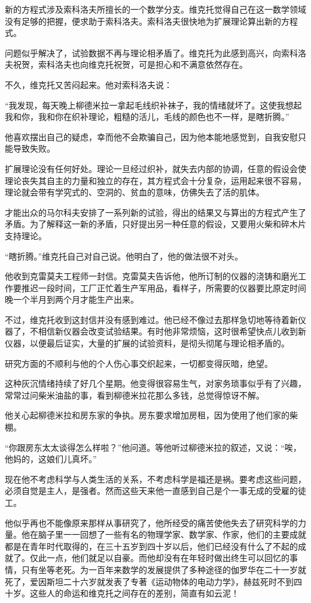 新的方程式涉及索科洛夫所擅长的一个数学分支。维克托觉得自己在这一数学领域没有足够的把握，便求助于索科洛夫。索科洛夫很快地为扩展理论算出新的方程式。

问题似乎解决了，试验数据不再与理论相矛盾了。维克托为此感到高兴，向索科洛夫祝贺，索科洛夫也向维克托祝贺，可是担心和不满意依然存在。

不久，维克托又苦闷起来。他对索科洛夫说：

“我发现，每天晚上柳德米拉一拿起毛线织补袜子，我的情绪就坏了。这使我想起我和你，我和你在织补理论，粗糙的活儿，毛线的颜色也不一样，是瞎折腾。”

他喜欢摆出自己的疑虑，幸而他不会欺骗自己，因为他本能地感觉到，自我安慰只能导致失败。

扩展理论没有任何好处。理论一旦经过织补，就失去内部的协调，任意的假设会使理论丧失其自主的力量和独立的存在，其方程式会十分复杂，运用起来很不容易，理论就会带有学究式的、空洞的、贫血的意味，仿佛失去了活的肌体。

才能出众的马尔科夫安排了一系列新的试验，得出的结果又与算出的方程式产生了矛盾。为了解释这一新的矛盾，只好提出另一种任意的假设，又要用火柴和碎木片支持理论。

“瞎折腾。”维克托自己对自己说。他明白了，他的做法很不对头。

他收到克雷莫夫工程师一封信。克雷莫夫告诉他，他所订制的仪器的浇铸和磨光工作要推迟一段时间，工厂正忙着生产军用品，看样子，所需要的仪器要比原定时间晚一个半月到两个月才能生产出来。

不过，维克托收到这封信并没有感到难过。他已经不像过去那样急切地等待着新仪器了，不相信新仪器会改变试验结果。有时他非常烦恼，这时很希望快点儿收到新仪器，以便最后证实，大量的扩展的试验资料，是彻头彻尾与理论相矛盾的。

研究方面的不顺利与他的个人伤心事交织起来，一切都变得灰暗，绝望。

这种灰沉情绪持续了好几个星期。他变得很容易生气，对家务琐事似乎有了兴趣，常常过问柴米油盐的事，看到柳德米拉花那么多钱，总觉得惊讶不解。

他关心起柳德米拉和房东家的争执。房东要求增加房租，因为使用了他们家的柴棚。

“你跟房东太太谈得怎么样啦？”他问道。等他听过柳德米拉的叙述，又说：“唉，他妈的，这娘们儿真坏。”

现在他不考虑科学与人类生活的关系，不考虑科学是福还是祸。要考虑这些问题，必须自觉是主人，是强者。然而这些天来他一直感到自己是个一事无成的受雇的徒工。

他似乎再也不能像原来那样从事研究了，他所经受的痛苦使他失去了研究科学的力量。他在脑子里一一回想了一些有名的物理学家、数学家、作家，他们的主要成就都是在青年时代取得的，在三十五岁到四十岁以后，他们已经没有什么了不起的成就了。仅此一点，他们就足以自豪。而他却没有在年轻时做出终生可以回忆的事情，只有坐等老死。为一百年来数学的发展提供了多种途径的伽罗华在二十一岁就死了，爱因斯坦二十六岁就发表了专著《运动物体的电动力学》，赫兹死时不到四十岁。这些人的命运和维克托之间存在的差别，简直有如云泥！


